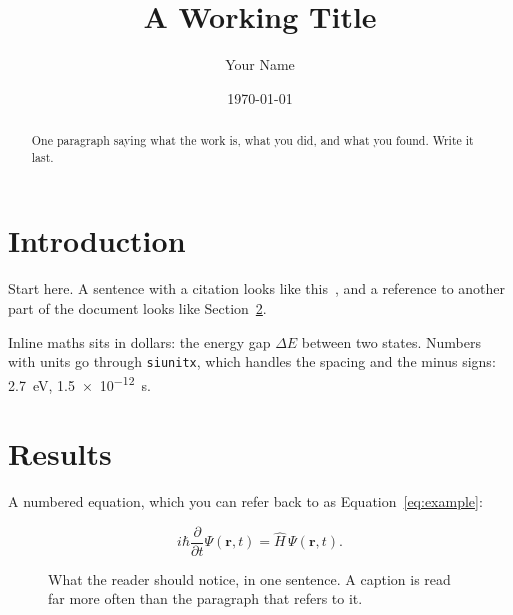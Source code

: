 \documentclass[11pt]{article}
\title{A Working Title}
\author{Your Name}
\date{\today}
\begin{document}
\maketitle

\begin{abstract}
  One paragraph saying what the work is, what you did, and what you found.
  Write it last.
\end{abstract}

\section{Introduction}
\label{sec:introduction}

Start here.  A sentence with a citation looks like this~\cite{knuth1984}, and
a reference to another part of the document looks like
Section~\ref{sec:results}.

Inline maths sits in dollars: the energy gap $\Delta E$ between two states.
Numbers with units go through \texttt{siunitx}, which handles the spacing and
the minus signs: \SI{2.7}{\electronvolt}, \SI{1.5e-12}{\second}.

\section{Results}
\label{sec:results}

A numbered equation, which you can refer back to as
Equation~\eqref{eq:example}:

\begin{equation}
  \label{eq:example}
  i\hbar \frac{\partial}{\partial t} \Psi(\mathbf{r}, t)
    = \hat{H}\, \Psi(\mathbf{r}, t).
\end{equation}

\begin{figure}[htbp]
  \centering
  \caption{What the reader should notice, in one sentence. A caption is read
    far more often than the paragraph that refers to it.}
  \label{fig:example}
\end{figure}
\end{document}
